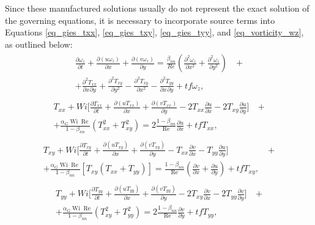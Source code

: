 \documentclass[preprint, 12pt]{elsarticle}
\begin{document}
Since these manufactured solutions usually do not represent the exact solution of the governing equations, it is necessary to incorporate source terms into Equations \eqref{eq_gies_txx}, \eqref{eq_gies_txy}, \eqref{eq_gies_tyy}, and \eqref{eq_vorticity_wz}, as outlined below:
\begin{gather}
    \begin{aligned}
        \frac{\partial \omega_{z}}{\partial t} + \frac{\partial (u\omega_{z})}{\partial x} + \frac{\partial (v\omega_{z})}{\partial y} = \frac{\beta_{nn}}{Re}\left(\frac{\partial^{2} \omega_{z}}{\partial x^{2}} + \frac{\partial^{2} \omega_{z}}{\partial y^{2}}\right) &~+ \\ + \frac{\partial^{2}T_{xx}}{\partial x^{}\partial y^{}} + \frac{\partial^{2}T_{xy}}{\partial y^{2}} - \frac{\partial^{2}T_{xy}}{\partial x^{2}} - \frac{\partial^{2}T_{yy}}{\partial x^{}\partial y^{}} + tf\omega_{z},\label{eq_vortic_corrent_MMS}
    \end{aligned}
\end{gather}
\begin{gather}
    \begin{aligned}
        T_{xx} + Wi\bigg[\frac{\partial T_{xx}}{\partial t} + \frac{\partial (uT_{xx})}{\partial x} + \frac{\partial (vT_{xx})}{\partial y} - 2T_{xx}\frac{\partial u}{\partial x} - 2T_{xy}\frac{\partial u}{\partial y}\bigg] &~+ \\ + \frac{\alpha_{G}\operatorname{Wi}\operatorname{Re}}{1-\beta_{nn}}\left(T_{xx}^{2} + T_{xy}^{2}\right) = 2\frac{1-\beta_{nn}}{\operatorname{Re}}\frac{\partial u}{\partial x} + tfT_{xx},\label{eq_gies_txx_source_term_1}
    \end{aligned}
\end{gather}
\begin{gather}
    \begin{aligned}
        T_{xy} + Wi\bigg[\frac{\partial T_{xy}}{\partial t} + \frac{\partial (uT_{xy})} {\partial x} + \frac{\partial (vT_{xy})}{\partial y} - T_{xx}\frac{\partial v}{\partial x} - T_{yy}\frac{\partial u}{\partial y}\bigg] &~+ \\ + \frac{\alpha_{G}\operatorname{Wi}\operatorname{Re}}{1-\beta_{nn}}\left[T_{xy}\left(T_{xx} + T_{yy}\right)\right] = \frac{1-\beta_{nn}}{\operatorname{Re}}\left(\frac{\partial v}{\partial x} + \frac{\partial u}{\partial y}\right) + tfT_{xy},\label{eq_gies_txy_source_term_1}
    \end{aligned}
\end{gather}
\begin{gather}
    \begin{aligned}
        T_{yy} + Wi\bigg[\frac{\partial T_{yy}}{\partial t} + \frac{\partial (uT_{yy})}{\partial x} + \frac{\partial (vT_{yy})}{\partial y} - 2T_{xy}\frac{\partial v}{\partial x} - 2T_{yy}\frac{\partial v}{\partial y}\bigg] &~+ \\ + \frac{\alpha_{G}\operatorname{Wi}\operatorname{Re}}{1-\beta_{nn}}\left(T_{xy}^{2} + T_{yy}^{2}\right) = 2\frac{1-\beta_{nn}}{\operatorname{Re}}\frac{\partial v}{\partial y}+ tfT_{yy}, \label{eq_gieskus_tyy_source_term_1}
    \end{aligned}
\end{gather}
\end{document}
